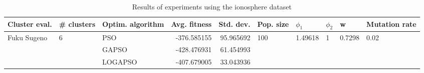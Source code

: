 \begin{table}
\centering
\caption{Results of experiments using the ionosphere dataset}
\begin{tabular}{lllrrlllll}
\toprule
               Cluster eval. &        \# clusters & Optim. algorithm &  Avg. fitness &  Std. dev. &            Pop. size &               $\phi_{1}$ &         $\phi_{2}$ &                       w &         Mutation rate \\
\midrule
\multirow{3}{*}{Fuku Sugeno} & \multirow{3}{*}{6} &              PSO &   -376.585155 &  95.965692 & \multirow{3}{*}{100} & \multirow{3}{*}{1.49618} & \multirow{3}{*}{1} & \multirow{3}{*}{0.7298} & \multirow{3}{*}{0.02} \\
                             &                    &            GAPSO &   -428.476931 &  61.454993 &                      &                          &                    &                         &                       \\
                             &                    &          LOGAPSO &   -407.679005 &  33.043936 &                      &                          &                    &                         &                       \\
\bottomrule
\end{tabular}
\end{table}
